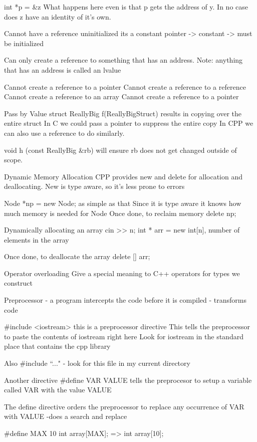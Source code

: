 \documentclass[12pt,oneside,fleqn]{book}
\begin{document}
int *p = \&z
What happens here even is that p gets the address of y. In no case does z have an identity of it's own.

Cannot have a reference uninitialized
its a constant pointer -> constant -> must be initialized

Can only create a reference to something that has an address.
Note: anything that has an address is called an lvalue

Cannot create a reference to a pointer
Cannot create a reference to a reference
Cannot create a reference to an array
Cannot create a reference to a pointer


Pass by Value
struct ReallyBig
f(ReallyBigStruct)
results in copying over the entire struct
In C we could pass a pointer to suppress the entire copy
In CPP we can also use a reference to do similarly.

void h (const ReallyBig \&rb) will ensure rb does not get changed outside of scope.

Dynamic Memory Allocation
CPP provides new and delete for allocation and deallocating.
New is type aware, so it's less prone to errors

Node *np = new Node;
as simple as that
Since it is type aware it knows how much memory is needed for Node
Once done, to reclaim memory
delete np;

Dynamically allocating an array
cin >> n;
int * arr = new int[n], number of elements in the array

Once done, to deallocate the array
delete [] arr;

Operator overloading
Give a special meaning to C++ operators for types we construct



\newpage
Preprocessor
- a program intercepts the code before it is compiled
- transforms code

\#include <iostream>
this is a preprocessor directive
This tells the preprocessor to paste the contents of iostream right here
Look for iostream in the standard place that contains the cpp library

Also
\#include ``..."
- look for this file in my current directory

Another directive
\#define VAR VALUE
tells the preprocesor to setup a variable called VAR with the value VALUE

The define directive orders the preprocessor to replace any occurrence of VAR with VALUE
-does a search and replace

\#define MAX 10
int array[MAX]; => int array[10];
\end{document}

